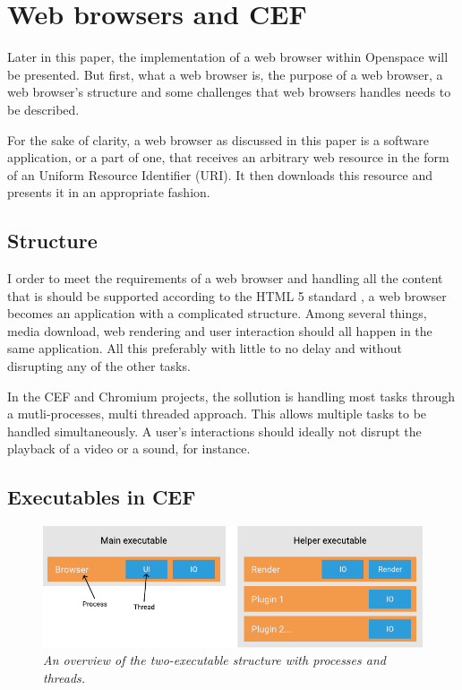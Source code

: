 
\section{Web browsers and CEF}

Later in this paper, the implementation of a web browser within Openspace will be presented. But first, what a web browser is, the purpose of a web browser, a web browser's structure and some challenges that web browsers handles needs to be described.

For the sake of clarity, a web browser as discussed in this paper is a software application, or a part of one, that receives an arbitrary web resource in the form of an Uniform Resource Identifier (URI). \cite{jacobs2009uri} It then downloads this resource and presents it in an appropriate fashion.

\subsection{Structure}

I order to meet the requirements of a web browser and handling all the content that is should be supported according to the HTML 5 standard \cite{html}, a web browser becomes an application with a complicated structure. Among several things, media download, web rendering and user interaction should all happen in the same application. All this preferably with little to no delay and without disrupting any of the other tasks.

In the CEF and Chromium projects, the sollution is handling most tasks through a mutli-processes, multi threaded approach. \cite{cefusage} This allows multiple tasks to be handled simultaneously. A user's interactions should ideally not disrupt the playback of a video or a sound, for instance.


\subsection{Executables in CEF}

\begin{figure}[h]
\centering
\includegraphics[width=0.9\linewidth]{./figures/process.pdf}
\caption{\emph{An overview of the two-executable structure with processes and threads.}}\label{fig:processes}
\end{figure}

